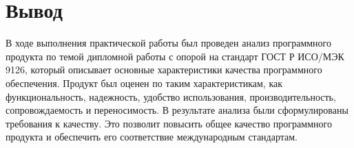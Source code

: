 \clearpage

\section*{\LARGE Вывод}

В ходе выполнения практической работы был проведен анализ
программного продукта по темой дипломной работы
с опорой на стандарт ГОСТ Р ИСО/МЭК 9126,
который описывает основные характеристики качества программного обеспечения.
Продукт был оценен по таким характеристикам, как
функциональность, надежность, удобство использования, производительность,
сопровождаемость и переносимость.
В результате анализа были сформулированы требования к качеству.
Это позволит повысить общее качество программного продукта
и обеспечить его соответствие международным стандартам.


